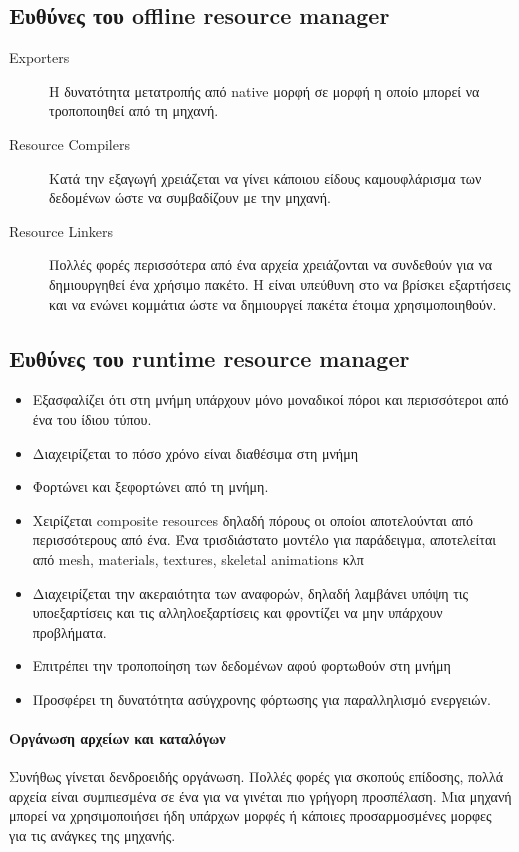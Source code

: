 \subsection{Ευθύνες του offline resource manager}
\begin{description}
\item [Exporters]  Η δυνατότητα μετατροπής από native μορφή σε μορφή η οποίο μπορεί να τροποποιηθεί από τη μηχανή.
\item [Resource Compilers] Κατά την εξαγωγή χρειάζεται να γίνει κάποιου είδους καμουφλάρισμα των δεδομένων ώστε να συμβαδίζουν με την μηχανή.
\item [Resource Linkers] Πολλές φορές περισσότερα από ένα αρχεία χρειάζονται να συνδεθούν για να δημιουργηθεί ένα χρήσιμο πακέτο. Η είναι υπεύθυνη στο να βρίσκει εξαρτήσεις και να ενώνει κομμάτια ώστε να δημιουργεί πακέτα έτοιμα χρησιμοποιηθούν.
\end{description}

\subsection{Ευθύνες του runtime resource manager}
\begin{itemize}
\item Εξασφαλίζει ότι στη μνήμη υπάρχουν μόνο μοναδικοί πόροι και περισσότεροι από ένα του ίδιου τύπου.
\item Διαχειρίζεται το πόσο χρόνο είναι διαθέσιμα στη μνήμη
\item Φορτώνει και ξεφορτώνει από τη μνήμη.
\item Χειρίζεται composite resources δηλαδή πόρους οι οποίοι αποτελούνται από περισσότερους από ένα. Ένα τρισδιάστατο μοντέλο για παράδειγμα, αποτελείται από mesh, materials, textures, skeletal animations κλπ
\item Διαχειρίζεται την ακεραιότητα των αναφορών, δηλαδή λαμβάνει υπόψη τις υποεξαρτίσεις και τις αλληλοεξαρτίσεις και φροντίζει να μην υπάρχουν προβλήματα.
\item Επιτρέπει την τροποποίηση των δεδομένων αφού φορτωθούν στη μνήμη
\item Προσφέρει τη δυνατότητα ασύγχρονης φόρτωσης για παραλληλισμό ενεργειών.
\end{itemize}

\paragraph{Οργάνωση αρχείων και καταλόγων}
Συνήθως γίνεται δενδροειδής οργάνωση. Πολλές φορές για σκοπούς επίδοσης, πολλά αρχεία είναι συμπιεσμένα σε ένα για να γινέται πιο γρήγορη προσπέλαση. Μια μηχανή μπορεί να χρησιμοποιήσει ήδη υπάρχων μορφές ή κάποιες προσαρμοσμένες μορφες για τις ανάγκες της μηχανής. 

